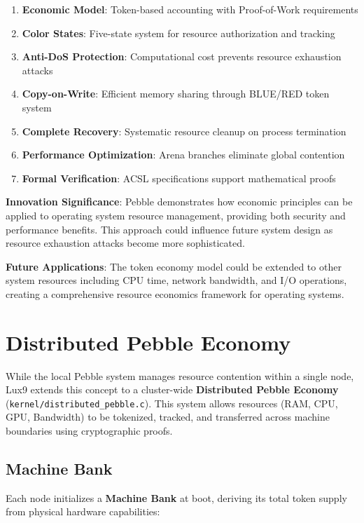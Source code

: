 \documentclass[11pt,letterpaper]{article}
\begin{document}
\begin{enumerate}
\item \textbf{Economic Model}: Token-based accounting with Proof-of-Work requirements
\item \textbf{Color States}: Five-state system for resource authorization and tracking
\item \textbf{Anti-DoS Protection}: Computational cost prevents resource exhaustion attacks
\item \textbf{Copy-on-Write}: Efficient memory sharing through BLUE/RED token system
\item \textbf{Complete Recovery}: Systematic resource cleanup on process termination
\item \textbf{Performance Optimization}: Arena branches eliminate global contention
\item \textbf{Formal Verification}: ACSL specifications support mathematical proofs
\end{enumerate}

\textbf{Innovation Significance}: Pebble demonstrates how economic principles can be applied to operating system resource management, providing both security and performance benefits. This approach could influence future system design as resource exhaustion attacks become more sophisticated.

\textbf{Future Applications}: The token economy model could be extended to other system resources including CPU time, network bandwidth, and I/O operations, creating a comprehensive resource economics framework for operating systems.

\section{Distributed Pebble Economy}

While the local Pebble system manages resource contention within a single node, Lux9 extends this concept to a cluster-wide \textbf{Distributed Pebble Economy} (\texttt{kernel/distributed_pebble.c}). This system allows resources (RAM, CPU, GPU, Bandwidth) to be tokenized, tracked, and transferred across machine boundaries using cryptographic proofs.

\subsection{Machine Bank}

Each node initializes a \textbf{Machine Bank} at boot, deriving its total token supply from physical hardware capabilities:
\end{document}
